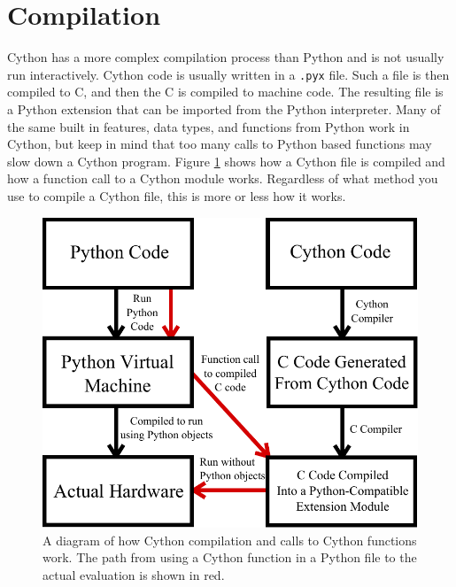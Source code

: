 \section*{Compilation}

Cython has a more complex compilation process than Python and is not usually run interactively.
Cython code is usually written in a \texttt{.pyx} file.
Such a file is then compiled to C, and then the C is compiled to machine code.
The resulting file is a Python extension that can be imported from the Python interpreter.
Many of the same built in features, data types, and functions from Python work in Cython, but keep in mind that too many calls to Python based functions may slow down a Cython program.
Figure \ref{cython:compilation} shows how a Cython file is compiled and how a function call to a Cython module works.
Regardless of what method you use to compile a Cython file, this is more or less how it works.

\begin{figure}
\centering
\includegraphics[width=\textwidth]{compilation.pdf}
\caption{A diagram of how Cython compilation and calls to Cython functions work.
The path from using a Cython function in a Python file to the actual evaluation is shown in red.}
\label{cython:compilation}
\end{figure}

